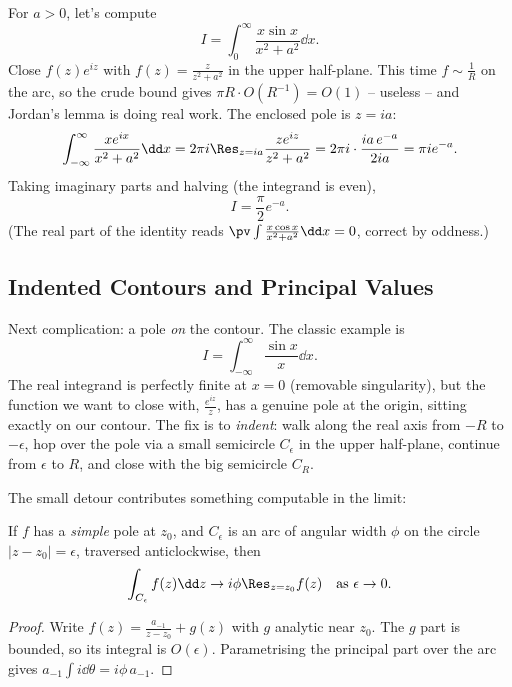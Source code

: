 \begin{example}
	For $a > 0$, let's compute
	$$
	I = \int_0^\infty \frac{x \sin x}{x^2 + a^2} \dd x.
	$$
	Close $f(z) e^{iz}$ with $f(z) = \frac{z}{z^2 + a^2}$ in the upper half-plane. This time $f \sim \frac 1R$ on the arc, so the crude bound gives $\pi R \cdot O(R^{-1}) = O(1)$ -- useless -- and Jordan's lemma is doing real work. The enclosed pole is $z = ia$:
	$$
	\int_{-\infty}^\infty \frac{x e^{ix}}{x^2 + a^2} \dd x = 2\pi i \Res_{z = ia} \frac{z e^{iz}}{z^2 + a^2} = 2\pi i \cdot \frac{ia \, e^{-a}}{2ia} = \pi i e^{-a}.
	$$
	Taking imaginary parts and halving (the integrand is even),
	$$
	I = \frac{\pi}{2} e^{-a}.
	$$
	(The real part of the identity reads $\pv\int \frac{x\cos x}{x^2 + a^2} \dd x = 0$, correct by oddness.)
\end{example}

\subsection{Indented Contours and Principal Values}

Next complication: a pole \emph{on} the contour. The classic example is
$$
I = \int_{-\infty}^\infty \frac{\sin x}{x} \dd x.
$$
The real integrand is perfectly finite at $x = 0$ (removable singularity), but the function we want to close with, $\frac{e^{iz}}{z}$, has a genuine pole at the origin, sitting exactly on our contour. The fix is to \emph{indent}: walk along the real axis from $-R$ to $-\epsilon$, hop over the pole via a small semicircle $C_\epsilon$ in the upper half-plane, continue from $\epsilon$ to $R$, and close with the big semicircle $C_R$.

\begin{center}
\end{center}

The small detour contributes something computable in the limit:

\begin{lemma}
	If $f$ has a \emph{simple} pole at $z_0$, and $C_\epsilon$ is an arc of angular width $\phi$ on the circle $|z - z_0| = \epsilon$, traversed anticlockwise, then
	$$
	\int_{C_\epsilon} f(z) \dd z \to i \phi \Res_{z = z_0} f(z) \quad \text{as } \epsilon \to 0.
	$$
\end{lemma}
\begin{proof}
	Write $f(z) = \frac{a_{-1}}{z - z_0} + g(z)$ with $g$ analytic near $z_0$. The $g$ part is bounded, so its integral is $O(\epsilon)$. Parametrising the principal part over the arc gives $a_{-1} \int i \dd\theta = i\phi \, a_{-1}$.
\end{proof}

